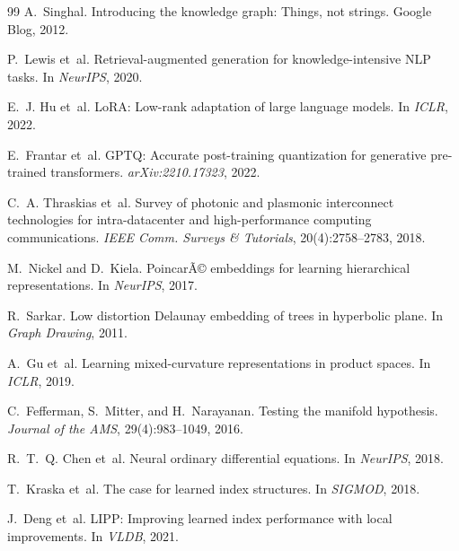 ﻿\documentclass[12pt,a4paper]{article}
\begin{document}
\begin{thebibliography}{99}
A.~Singhal.
\newblock Introducing the knowledge graph: Things, not strings.
\newblock Google Blog, 2012.

P.~Lewis et~al.
\newblock Retrieval-augmented generation for knowledge-intensive NLP tasks.
\newblock In \textit{NeurIPS}, 2020.

E.~J. Hu et~al.
\newblock LoRA: Low-rank adaptation of large language models.
\newblock In \textit{ICLR}, 2022.

E.~Frantar et~al.
\newblock GPTQ: Accurate post-training quantization for generative pre-trained
  transformers.
\newblock \textit{arXiv:2210.17323}, 2022.

C.~A. Thraskias et~al.
\newblock Survey of photonic and plasmonic interconnect technologies for
  intra-datacenter and high-performance computing communications.
\newblock \textit{IEEE Comm. Surveys \& Tutorials}, 20(4):2758--2783, 2018.

M.~Nickel and D.~Kiela.
\newblock PoincarÃ© embeddings for learning hierarchical representations.
\newblock In \textit{NeurIPS}, 2017.

R.~Sarkar.
\newblock Low distortion Delaunay embedding of trees in hyperbolic plane.
\newblock In \textit{Graph Drawing}, 2011.

A.~Gu et~al.
\newblock Learning mixed-curvature representations in product spaces.
\newblock In \textit{ICLR}, 2019.

C.~Fefferman, S.~Mitter, and H.~Narayanan.
\newblock Testing the manifold hypothesis.
\newblock \textit{Journal of the AMS}, 29(4):983--1049, 2016.

R.~T.~Q. Chen et~al.
\newblock Neural ordinary differential equations.
\newblock In \textit{NeurIPS}, 2018.

T.~Kraska et~al.
\newblock The case for learned index structures.
\newblock In \textit{SIGMOD}, 2018.

J.~Deng et~al.
\newblock LIPP: Improving learned index performance with local improvements.
\newblock In \textit{VLDB}, 2021.


\end{thebibliography}
\end{document}
